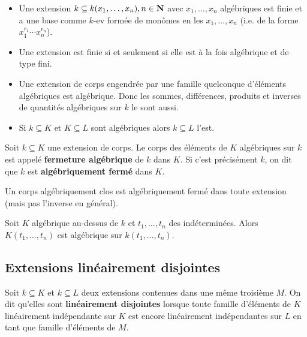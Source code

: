 	\begin{cor}
		\begin{itemize}
			\item[\textbullet] Une extension $k \subseteq k(x_1,\ldots,x_n), n \in \mathbf{N}$ avec $x_1,\ldots,x_n$ algébriques est finie et a une base comme $k$-ev formée de monômes en les $x_1,\ldots,x_n$ (i.e. de la forme $x_1^{r_1} \cdots x_n^{r_n}$).
			\item[\textbullet] Une extension est finie si et seulement si elle est à la fois algébrique et de type fini.
			\item[\textbullet] Une extension de corps engendrée par une famille quelconque d'éléments algébriques est algébrique.
				Donc les sommes, différences, produits et inverses de quantités algébriques sur $k$ le sont aussi.
			\item[\textbullet] Si $k \subseteq K$ et $K \subseteq L$ sont algébriques alors $k \subseteq L$ l'est.
		\end{itemize}
	\end{cor}
	
	\begin{defn}
		Soit $k \subseteq K$ une extension de corps.
		Le corps des éléments de $K$ algébriques sur $k$ est appelé \textbf{fermeture algébrique} de $k$ dans $K$.
		Si c'est précisément $k$, on dit que $k$ est \textbf{algébriquement fermé} dans $K$.
	\end{defn}
	
	\begin{pop}
		Un corps algébriquement clos est algébriquement fermé dans toute extension (mais pas l'inverse en général).
	\end{pop}
	
	\begin{rem}
		Soit $K$ algébrique au-dessus de $k$ et $t_1,\ldots,t_n$ des indéterminées.
		Alors $K(t_1,\ldots,t_n)$ est algébrique sur $k(t_1,\ldots,t_n)$.
	\end{rem}


\subsection{Extensions linéairement disjointes}

	\begin{defn}
		Soit $k \subseteq K$ et $k \subseteq L$ deux extensions contenues dans une même troisième $M$.
		On dit qu'elles sont \textbf{linéairement disjointes} lorsque toute famille d'éléments de $K$ linéairement indépendante sur $K$ est encore linéairement indépendantes sur $L$ en tant que famille d'éléments de $M$.
	\end{defn}
	
